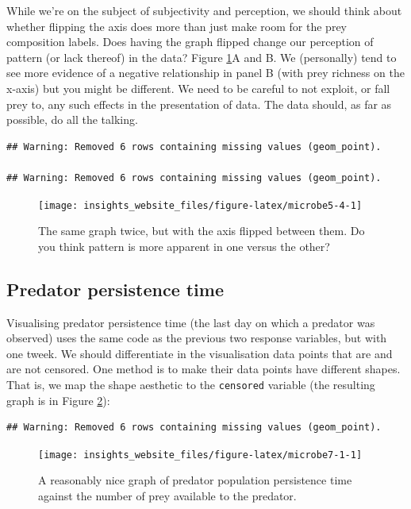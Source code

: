 \documentclass[]{book}
\begin{document}
While we're on the subject of subjectivity and perception, we should think about whether flipping the axis does more than just make room for the prey composition labels. Does having the graph flipped change our perception of pattern (or lack thereof) in the data? Figure \ref{fig:microbe5-4}A and B. We (personally) tend to see more evidence of a negative relationship in panel B (with prey richness on the x-axis) but you might be different. We need to be careful to not exploit, or fall prey to, any such effects in the presentation of data. The data should, as far as possible, do all the talking.

\begin{verbatim}
## Warning: Removed 6 rows containing missing values (geom_point).

## Warning: Removed 6 rows containing missing values (geom_point).
\end{verbatim}

\begin{figure}

{\centering \texttt{[image: insights\_website\_files/figure-latex/microbe5-4-1]} 

}

\caption{The same graph twice, but with the axis flipped between them. Do you think pattern is more apparent in one versus the other?}\label{fig:microbe5-4}
\end{figure}

\hypertarget{predator-persistence-time}{%
\subsection{Predator persistence time}\label{predator-persistence-time}}

Visualising predator persistence time (the last day on which a predator was observed) uses the same code as the previous two response variables, but with one tweek. We should differentiate in the visualisation data points that are and are not censored. One method is to make their data points have different shapes. That is, we map the shape aesthetic to the \texttt{censored} variable (the resulting graph is in Figure \ref{fig:microbe7-1}):

\begin{verbatim}
## Warning: Removed 6 rows containing missing values (geom_point).
\end{verbatim}

\begin{figure}

{\centering \texttt{[image: insights\_website\_files/figure-latex/microbe7-1-1]} 

}

\caption{A reasonably nice graph of predator population persistence time against the number of prey available to the predator.}\label{fig:microbe7-1}
\end{figure}
\end{document}

